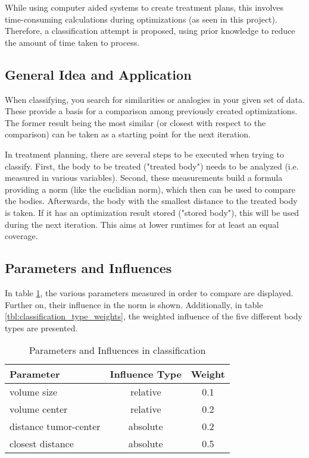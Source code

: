 While using computer aided systems to create treatment plans, this involves time-consuming calculations during optimizations (as seen in this project). Therefore, a classification attempt is proposed, using prior knowledge to reduce the amount of time taken to process.

\subsection{General Idea and Application}
When classifying, you search for similarities or analogies in your given set of data. These provide a basis for a comparison among previously created optimizations. The former result being the most similar (or closest with respect to the comparison) can be taken as a starting point for the next iteration.

In treatment planning, there are several steps to be executed when trying to classify. First, the body to be treated ("treated body") needs to be analyzed (i.e. measured in various variables). Second, these measurements build a formula providing a norm (like the euclidian norm), which then can be used to compare the bodies. Afterwards, the body with the smallest distance to the treated body is taken. If it has an optimization result stored ("stored body"), this will be used during the next iteration. This aims at lower runtimes for at least an equal coverage.

\subsection{Parameters and Influences}
In table \ref{tbl:classification_parameters}, the various parameters measured in order to compare are displayed. Further on, their influence in the norm is shown. Additionally, in table \ref{tbl:classification_type_weights}, the weighted influence of the five different body types are presented.
\begin{table}
\centering
\caption{Parameters and Influences in classification}
\begin{tabular}[htbp]{l | c | c}
\textbf{Parameter} & \textbf{Influence Type} & \textbf{Weight} \\ \hline
volume size  & relative & 0.1\\ \hline
volume center & relative & 0.2 \\ \hline
distance tumor-center & absolute & 0.2\\ \hline
closest distance & absolute & 0.5
\end{tabular}
\label{tbl:classification_parameters}
\end{table}

